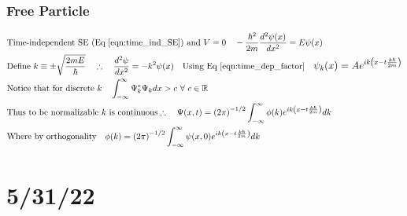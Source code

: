 \documentclass[12pt]{article}
\begin{document}
\subsubsection{Free Particle}
\begin{align}
 &\text{Time-independent SE (Eq \ref{eqn:time_ind_SE}) and }V=0\quad -\frac{\hbar^2}{2m}\frac{d^2\psi(x)}{dx^2}=E\psi(x)\\
 &\text{Define }k\equiv\pm\sqrt{\frac{2mE}{\hbar}}\quad\therefore\quad \frac{d^2\psi}{dx^2}=-k^2\psi(x)\quad\text{Using Eq \ref{eqn:time_dep_factor}}\quad \mathlarger{\psi_k(x)=Ae^{ik\left(x-t\frac{k\hbar}{2m}\right)}}\\
 &\text{Notice that for discrete }k\quad \int_{-\infty}^\infty \Psi_k^*\Psi_kdx>c\ \forall\ c\in\mathbb{R}\\
&\text{Thus to be normalizable }k \text{ is continuous}\therefore\quad \Psi(x,t)=\left(2\pi\right)^{-1/2}\int_{-\infty}^\infty\phi(k)e^{ik\left(x-t\frac{k\hbar}{2m}\right)} dk
\\
&\text{Where by orthogonality}\quad \phi(k)=\left(2\pi\right)^{-1/2}\int_{-\infty}^\infty\psi(x,0)e^{ik\left(x-t\frac{k\hbar}{2m}\right)} dk
\end{align}

\section{5/31/22}
\end{document}
